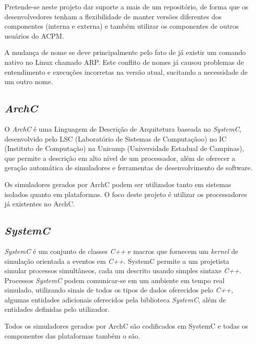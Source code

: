 \documentclass[10pt,a4paper]{article}
\begin{document}
Pretende-se neste projeto dar suporte a mais de um repositório, de
forma que os desenvolvedores tenham a flexibilidade de manter versões
diferentes dos componentes (interna e externa) e também utilizar os
componentes de outros usuários do ACPM.

A mudança de nome se deve principalmente pelo fato de já existir um
comando nativo no Linux chamado ARP. Este conflito de nomes já causou
problemas de entendimento e execuções incorretas na versão atual,
sucitando a necessidade de um outro nome.
        
\subsection{\textit{ArchC}}
O \textit{ArchC} é uma Linguagem de Descrição de Arquitetura baseada
no \textit{SystemC}, desenvolvido pelo LSC (Laboratório de Sistemas de
Computaçãoo) no IC (Instituto de Computação) na Unicamp (Universidade
Estadual de Campinas), que permite a descrição em alto nível de um
processador, além de oferecer a geração automática de simuladores e
ferramentas de desenvolvimento de software.

Os simuladores gerados por ArchC podem ser utilizados tanto em
sistemas isolados quanto em plataformas. O foco deste projeto é
utilizar os processadores já existentes no ArchC.

\subsection{\textit{SystemC}}

\textit{SystemC} é um conjunto de classes \textit{C++} e macros que
fornecem um \textit{kernel} de simulação orientada a eventos em
\textit{C++}. SystemC permite a um projetista simular processos
simultâneos, cada um descrito usando simples sintaxe
\textit{C++}. Processos \textit{SystemC} podem comunicar-se em um
ambiente em tempo real simulado, utilizando sinais de todos os tipos
de dados oferecidos pelo \textit{C++}, algumas entidades adicionais
oferecidos pela biblioteca \textit{SystemC}, além de entidades
definidas pelo utilizador.

Todos os simuladores gerados por ArchC são codificados em SystemC e
todas os componentes das plataformas também o são.
\end{document}
